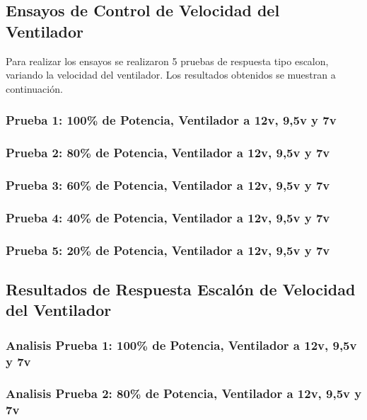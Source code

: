 \documentclass[spanish, a4paper, 11pt]{article}
\begin{document}
\subsection{Ensayos de Control de Velocidad del Ventilador}

Para realizar los ensayos se realizaron 5 pruebas de respuesta tipo escalon, variando la velocidad del ventilador. Los resultados obtenidos se muestran a continuación.

\subsubsection{Prueba 1: 100\% de Potencia, Ventilador a 12v, 9,5v y 7v}

\subsubsection{Prueba 2: 80\% de Potencia, Ventilador a 12v, 9,5v y 7v}

\subsubsection{Prueba 3: 60\% de Potencia, Ventilador a 12v, 9,5v y 7v}

\subsubsection{Prueba 4: 40\% de Potencia, Ventilador a 12v, 9,5v y 7v}

\subsubsection{Prueba 5: 20\% de Potencia, Ventilador a 12v, 9,5v y 7v}

\subsection{Resultados de Respuesta Escalón de Velocidad del Ventilador}

\subsubsection{Analisis Prueba 1: 100\% de Potencia, Ventilador a 12v, 9,5v y 7v}

\subsubsection{Analisis Prueba 2: 80\% de Potencia, Ventilador a 12v, 9,5v y 7v}
\end{document}
